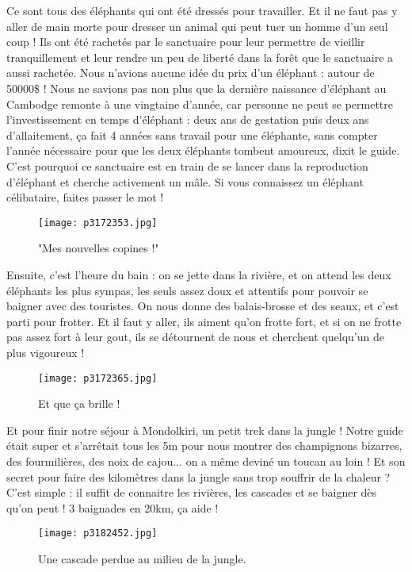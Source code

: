 \documentclass{book}
\begin{document}
Ce sont tous des éléphants qui ont été dressés pour travailler. Et il ne faut pas y aller de main morte pour dresser un animal qui peut tuer un homme d'un seul coup ! Ils ont été rachetés par le sanctuaire pour leur permettre de vieillir tranquillement et leur rendre un peu de liberté dans la forêt que le sanctuaire a aussi rachetée. Nous n'avions aucune idée du prix d'un éléphant : autour de 50000\$ ! Nous ne savions pas non plus que la dernière naissance d'éléphant au Cambodge remonte à une vingtaine d'année, car personne ne peut se permettre l'investissement en temps d'éléphant : deux ans de gestation puis deux ans d'allaitement, ça fait 4 années sans travail pour une éléphante, sans compter l'année nécessaire pour que les deux éléphants tombent amoureux, dixit le guide. C'est pourquoi ce sanctuaire est en train de se lancer dans la reproduction d'éléphant et cherche activement un mâle. Si vous connaissez un éléphant célibataire, faites passer le mot !


\begin{figure}[h]
\centering
\texttt{[image: p3172353.jpg]}
\caption*{"Mes nouvelles copines !"}
\end{figure}

Ensuite, c'est l'heure du bain : on se jette dans la rivière, et on attend les deux éléphants les plus sympas, les seuls assez doux et attentifs pour pouvoir se baigner avec des touristes. On nous donne des balais-brosse et des seaux, et c'est parti pour frotter. Et il faut y aller, ils aiment qu'on frotte fort, et si on ne frotte pas assez fort à leur gout, ils se détournent de nous et cherchent quelqu'un de plus vigoureux !


\begin{figure}[h]
\centering
\texttt{[image: p3172365.jpg]}
\caption*{Et que ça brille !}
\end{figure}

Et pour finir notre séjour à Mondolkiri, un petit trek dans la jungle ! Notre guide était super et s'arrêtait tous les 5m pour nous montrer des champignons bizarres, des fourmilières, des noix de cajou... on a même deviné un toucan au loin ! Et son secret pour faire des kilomètres dans la jungle sans trop souffrir de la chaleur ? C'est simple : il suffit de connaitre les rivières, les cascades et se baigner dès qu'on peut ! 3 baignades en 20km, ça aide !


\begin{figure}[h]
\centering
\texttt{[image: p3182452.jpg]}
\caption*{Une cascade perdue au milieu de la jungle.}
\end{figure}
\end{document}
